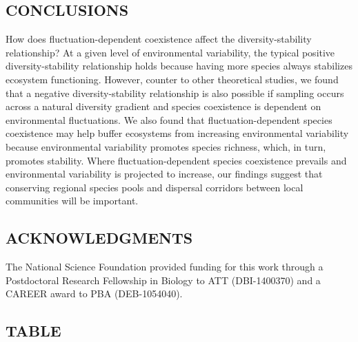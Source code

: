 \documentclass[12pt,]{article}
\begin{document}
\subsection{CONCLUSIONS}\label{conclusions}

How does fluctuation-dependent coexistence affect the
diversity-stability relationship? At a given level of environmental
variability, the typical positive diversity-stability relationship holds
because having more species always stabilizes ecosystem functioning.
However, counter to other theoretical studies, we found that a negative
diversity-stability relationship is also possible if sampling occurs
across a natural diversity gradient and species coexistence is dependent
on environmental fluctuations. We also found that fluctuation-dependent
species coexistence may help buffer ecosystems from increasing
environmental variability because environmental variability promotes
species richness, which, in turn, promotes stability. Where
fluctuation-dependent species coexistence prevails and environmental
variability is projected to increase, our findings suggest that
conserving regional species pools and dispersal corridors between local
communities will be important.

\subsection{ACKNOWLEDGMENTS}\label{acknowledgments}

The National Science Foundation provided funding for this work through a
Postdoctoral Research Fellowship in Biology to ATT (DBI-1400370) and a
CAREER award to PBA (DEB-1054040).

\newpage{}

\subsection{TABLE}\label{table}
\end{document}
